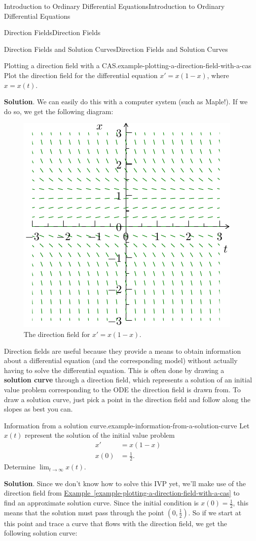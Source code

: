 \documentclass[10pt,]{book}
\newcommand{\terminology}[1]{\textbf{#1}}
\numberwithin{equation}{section}
\begin{document}
\begin{chapterptx}{Introduction to Ordinary Differential Equations}{}{Introduction to Ordinary Differential Equations}{}{}
\begin{sectionptx}{Direction Fields}{}{Direction Fields}{}{}
\begin{subsectionptx}{Direction Fields and Solution Curves}{}{Direction Fields and Solution Curves}{}{}
\begin{example}{Plotting a direction field with a CAS.}{example-plotting-a-direction-field-with-a-cas}
\hypertarget{p-43}{}%
Plot the direction field for the differential equation \(x' = x(1-x)\), where \(x=x(t)\).%
\par\smallskip%
\noindent\textbf{Solution}.\hypertarget{solution-7}{}\quad%
\hypertarget{p-44}{}%
We can easily do this with a computer system (such as Maple!). If we do so, we get the following diagram:%
\begin{figure}
\centering
\includegraphics[width=0.5\linewidth]{images/image-4.pdf}
\caption{The direction field for \(x' = x(1-x)\).\label{figure-dirfield1}}
\end{figure}
\end{example}
\hypertarget{p-45}{}%
Direction fields are useful because they provide a means to obtain information about a differential equation (and the corresponding model) without actually having to solve the differential equation. This is often done by drawing a \terminology{solution curve} through a direction field, which represents a solution of an initial value problem corresponding to the ODE the direction field is drawn from. To draw a solution curve, just pick a point in the direction field and follow along the slopes as best you can.%
\begin{example}{Information from a solution curve.}{example-information-from-a-solution-curve}%
\hypertarget{p-46}{}%
Let \(x(t)\) represent the solution of the initial value problem%
\begin{align*}
x' & = x(1-x) \\
x(0) & = \frac{1}{2}. 
\end{align*}
Determine \(\lim_{t\to\infty}x(t)\).%
\par\smallskip%
\noindent\textbf{Solution}.\hypertarget{solution-8}{}\quad%
\hypertarget{p-47}{}%
Since we don't know how to solve this IVP yet, we'll make use of the direction field from \hyperref[example-plotting-a-direction-field-with-a-cas]{Example~\ref{example-plotting-a-direction-field-with-a-cas}} to find an approximate solution curve. Since the initial condition is \(x(0) = \frac{1}{2}\), this means that the solution must pass through the point \((0,\frac{1}{2})\). So if we start at this point and trace a curve that flows with the direction field, we get the following solution curve:%

\end{example}
\end{subsectionptx}
\end{sectionptx}
\end{chapterptx}
\end{document}
